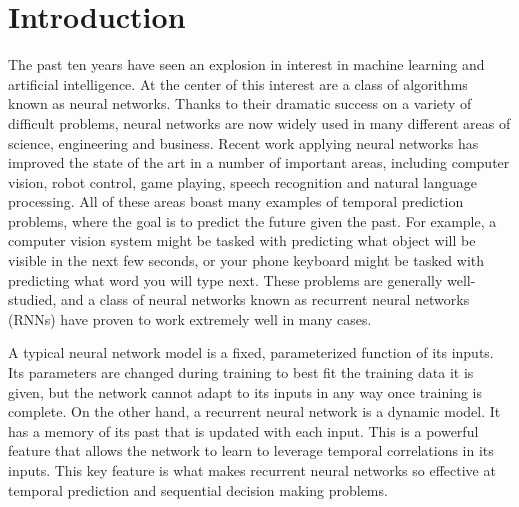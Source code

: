 \section{Introduction}

The past ten years have seen an explosion in interest in machine learning and artificial intelligence. At the center of this interest are a class of algorithms known as neural networks. Thanks to their dramatic success on a variety of difficult problems, neural networks are now widely used in many different areas of science, engineering and business. Recent work applying neural networks has improved the state of the art in a number of important areas, including computer vision, robot control, game playing, speech recognition and natural language processing. All of these areas boast many examples of temporal prediction problems, where the goal is to predict the future given the past. For example, a computer vision system might be tasked with predicting what object will be visible in the next few seconds, or your phone keyboard might be tasked with predicting what word you will type next. These problems are generally well-studied, and a class of neural networks known as recurrent neural networks (RNNs) have proven to work extremely well in many cases.

A typical neural network model is a fixed, parameterized function of its inputs. Its parameters are changed during training to best fit the training data it is given, but the network cannot adapt to its inputs in any way once training is complete.
On the other hand, a recurrent neural network is a dynamic model. It has a memory of its past that is updated with each input. This is a powerful feature that allows the network to learn to leverage temporal correlations in its inputs. This key feature is what makes recurrent neural networks so effective at temporal prediction and sequential decision making problems.

